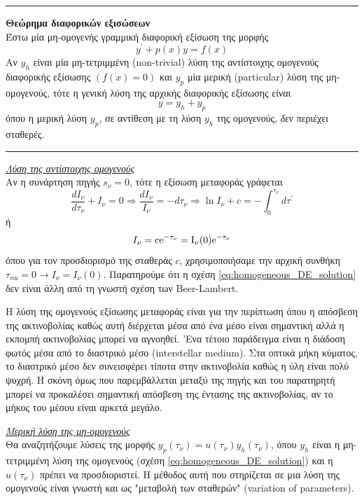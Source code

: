{\color{red} \hrule} 
\textbf{Θεώρημα διαφορικών εξισώσεων}\\
Έστω μία μη-ομογενής γραμμική διαφορική εξίσωση της μορφής $$y^{\prime} + p(x) y = f(x)$$ 
Αν $y_h$ είναι μία μη-τετριμμένη (non-trivial) λύση της αντίστοιχης ομογενούς διαφορικής εξίσωσης $(f(x) = 0)$ και $y_p$ μία μερική (particular) λύση της μη-ομογενούς, τότε η γενική λύση της αρχικής διαφορικής εξίσωσης είναι $$y = y_h + y_p$$
όπου η μερική λύση $y_p$, σε αντίθεση με τη λύση $y_h$ της ομογενούς, \textit{δεν} περιέχει σταθερές.\\
{\color{red} \hrule} 


\underline{\textit{Λύση της αντίστοιχης ομογενούς}}\\
Αν η συνάρτηση πηγής $s_{\nu} = 0$, τότε η εξίσωση μεταφοράς γράφεται
\begin{equation*}
    \frac{dI_{\nu}}{d\tau_{\nu}} + I_{\nu} = 0 \Rightarrow \frac{dI_{\nu}}{I_{\nu}} = - d\tau_{\nu} \Rightarrow \ln{I_{\nu}} + c = - \int_{0}^{\tau_{\nu}} d\tau^{\prime} 
\end{equation*}
ή
\begin{equation}
    \label{eq:homogeneous_DE_solution}
    I_{\nu} = \rm c e^{- \tau_{\nu}} = I_{\nu} (0) e^{- \tau_{\nu}}
\end{equation}
όπου για τον προσδιορισμό της σταθεράς $c$, χρησιμοποιήσαμε την αρχική συνθήκη $\tau_{nu} = 0 \longrightarrow I_{\nu} = I_{\nu} (0)$. Παρατηρούμε ότι η σχέση \eqref{eq:homogeneous_DE_solution} δεν είναι άλλη από τη γνωστή σχέση των Beer-Lambert.

Η λύση της ομογενούς εξίσωσης μεταφοράς είναι για την περίπτωση όπου η απόσβεση της ακτινοβολίας καθώς αυτή διέρχεται μέσα από ένα μέσο είναι σημαντική αλλά η εκπομπή ακτινοβολίας μπορεί να αγνοηθεί. 'Ενα τέτοιο παράδειγμα είναι η διάδοση φωτός μέσα από το διαστρικό μέσο (interstellar medium). Στα οπτικά μήκη κύματος, το διαστρικό μέσο δεν συνεισφέρει τίποτα στην ακτινοβολία καθώς η ύλη είναι πολύ ψυχρή. Η σκόνη όμως που παρεμβάλλεται μεταξύ της πηγής και του παρατηρητή μπορεί να προκαλέσει σημαντική απόσβεση της έντασης της ακτινοβολίας, αν το μήκος του μέσου είναι αρκετά μεγάλο.

\underline{\textit{Μερική λύση της μη-ομογενούς}}\\
Θα αναζητήζουμε λύσεις της μορφής $y_p(\tau_{\nu}) = u(\tau_{\nu}) y_h (\tau_{\nu})$, όπου $y_h$ είναι η μη-τετριμμένη λύση της ομογενούς (σχέση \eqref{eq:homogeneous_DE_solution}) και η $u(\tau_{\nu})$ πρέπει να προσδιοριστεί.
Η μέθοδος αυτή που στηρίζεται σε μια λύση της ομογενούς είναι γνωστή και ως "μεταβολή των σταθερών" (variation of parameters).


